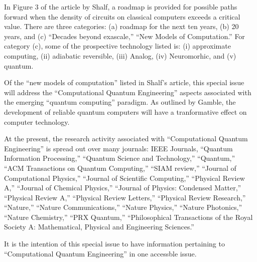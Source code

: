 \documentclass[]{article}
\begin{document}
In Figure 3 of the article by Shalf\cite{shalf2020future}, a roadmap is provided for possible paths forward when the density of circuits on classical computers exceeds a critical value.  There are three categories: (a) roadmap for the next ten years, (b) 20 years, and (c) ``Decades beyond exascale,'' ``New Models of Computation.'' For category (c), some of the prospective technology listed is:
(i) approximate computing, (ii) adiabatic reversible, (iii) Analog, (iv) Neuromorhic, and (v) quantum.

Of the ``new models of computation'' listed in 
Shalf's article\cite{shalf2020future}, this special issue will address
the ``Computational Quantum Engineering'' aspects associated with the
emerging ``quantum computing'' paradigm.  As outlined by
Gamble\cite{gamble2019quantum}, the development of reliable quantum
computers will have a tranformative effect on computer technology.

\begin{comment}

Explains how the anticipated contribution of the special issue will advance understanding in this area;

\end{comment}

At the present, the research activity associated with ``Computational Quantum Engineering''
is spread out over many journals: IEEE Journals, 
``Quantum Information Processing,'' 
``Quantum Science and Technology,'' 
``Quantum,'' 
``ACM Transactions on Quantum Computing,''
``SIAM review,''
``Journal of Computational Physics,''
``Journal of Scientific Computing,''
``Physical Review A,'' 
``Journal of Chemical Physics,'' 
``Journal of Physics: Condensed Matter,''
``Physical Review A,''
``Physical Review Letters,''
``Physical Review Research,''
``Nature,''
``Nature Communications,''
``Nature Physics,''
``Nature Photonics,''
``Nature Chemistry,''
``PRX Quantum,''
``Philosophical Transactions of the Royal Society A: Mathematical, Physical and Engineering Sciences.''

It is the intention of this special issue to have information pertaining
to ``Computational Quantum Engineering'' in one accessble issue.

\begin{comment}

Identifies papers and authors for possible inclusion in the special issue, with a brief description of each paper. (These papers do not need to have been written at this time, although it might be the case that work is already in progress.);

\end{comment}
\end{document}
